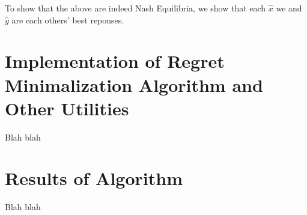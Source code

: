 \documentclass [11pt]{article}
\begin{document}
To show that the above are indeed Nash Equilibria, we show that each $\hat{x}$ we and $\hat{y}$ are each others' best reponses.



\section{Implementation of Regret Minimalization Algorithm and Other Utilities} \label{algorithm}

Blah blah

\section{Results of Algorithm} \label{results}

Blah blah



\end{document}
